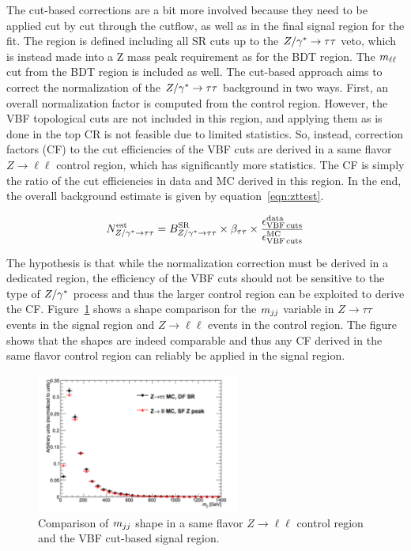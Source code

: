 The cut-based corrections are a bit more involved because they need to be applied cut by cut through the cutflow, as well as in the final signal region for the fit. The region is defined including all SR cuts up to the $Z/\gamma^{\ast} \to \tau\tau$ veto, which is instead made into a Z mass peak requirement as for the BDT region. The $m_{\ell\ell}$ cut from the BDT region is included as well. The cut-based approach aims to correct the normalization of the $Z/\gamma^{\ast} \to\tau\tau$ background in two ways. First, an overall normalization factor is computed from the control region. However, the VBF topological cuts are not included in this region, and applying them as is done in the top CR is not feasible due to limited statistics. So, instead, correction factors (CF) to the cut efficiencies of the VBF cuts are derived in a same flavor $Z\to\ell\ell$ control region, which has significantly more statistics. The CF is simply the ratio of the cut efficiencies in data and MC derived in this region. In the end, the overall background estimate is given by equation~\ref{eqn:zttest}.

\begin{equation}
N^{\rm est}_{Z/\gamma^{\ast} \to \tau\tau} = B^{\rm SR}_{Z/\gamma^{\ast} \to \tau\tau} \times \beta_{\tau\tau} \times \frac{\epsilon_{\rm VBF\,cuts}^{\rm data}}{\epsilon_{\rm VBF\,cuts}^{\rm MC}} 
\label{eqn:zttest}
\end{equation}

The hypothesis is that while the normalization correction must be derived in a dedicated region, the efficiency of the VBF cuts should not be sensitive to the type of $Z/\gamma^{\ast}$ process and thus the larger control region can be exploited to derive the CF. Figure~\ref{fig:vbf_ztt_comp} shows a shape comparison for the $m_{jj}$ variable in $Z\to\tau\tau$ events in the signal region and $Z\to\ell\ell$ events in the control region. The figure shows that the shapes are indeed comparable and thus any CF derived in the same flavor control region can reliably be applied in the signal region. 


\begin{figure}[h!]
  \centering
  \captionsetup{justification=centering}
  \includegraphics[width=0.6\textwidth]{figures/VBF_DYtt_shape_comp}
  \caption{Comparison of $m_{jj}$ shape in a same flavor $Z\to\ell\ell$ control region and the VBF cut-based signal region.}
  \label{fig:vbf_ztt_comp}
\end{figure}

